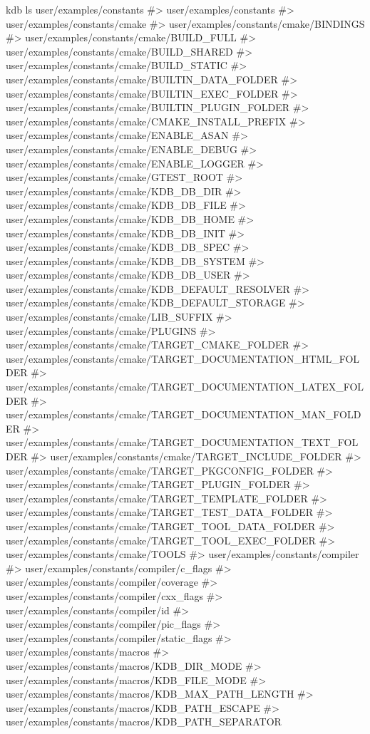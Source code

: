 \begin{DoxyCode}
kdb ls user/examples/constants
#> user/examples/constants
#> user/examples/constants/cmake
#> user/examples/constants/cmake/BINDINGS
#> user/examples/constants/cmake/BUILD\_FULL
#> user/examples/constants/cmake/BUILD\_SHARED
#> user/examples/constants/cmake/BUILD\_STATIC
#> user/examples/constants/cmake/BUILTIN\_DATA\_FOLDER
#> user/examples/constants/cmake/BUILTIN\_EXEC\_FOLDER
#> user/examples/constants/cmake/BUILTIN\_PLUGIN\_FOLDER
#> user/examples/constants/cmake/CMAKE\_INSTALL\_PREFIX
#> user/examples/constants/cmake/ENABLE\_ASAN
#> user/examples/constants/cmake/ENABLE\_DEBUG
#> user/examples/constants/cmake/ENABLE\_LOGGER
#> user/examples/constants/cmake/GTEST\_ROOT
#> user/examples/constants/cmake/KDB\_DB\_DIR
#> user/examples/constants/cmake/KDB\_DB\_FILE
#> user/examples/constants/cmake/KDB\_DB\_HOME
#> user/examples/constants/cmake/KDB\_DB\_INIT
#> user/examples/constants/cmake/KDB\_DB\_SPEC
#> user/examples/constants/cmake/KDB\_DB\_SYSTEM
#> user/examples/constants/cmake/KDB\_DB\_USER
#> user/examples/constants/cmake/KDB\_DEFAULT\_RESOLVER
#> user/examples/constants/cmake/KDB\_DEFAULT\_STORAGE
#> user/examples/constants/cmake/LIB\_SUFFIX
#> user/examples/constants/cmake/PLUGINS
#> user/examples/constants/cmake/TARGET\_CMAKE\_FOLDER
#> user/examples/constants/cmake/TARGET\_DOCUMENTATION\_HTML\_FOLDER
#> user/examples/constants/cmake/TARGET\_DOCUMENTATION\_LATEX\_FOLDER
#> user/examples/constants/cmake/TARGET\_DOCUMENTATION\_MAN\_FOLDER
#> user/examples/constants/cmake/TARGET\_DOCUMENTATION\_TEXT\_FOLDER
#> user/examples/constants/cmake/TARGET\_INCLUDE\_FOLDER
#> user/examples/constants/cmake/TARGET\_PKGCONFIG\_FOLDER
#> user/examples/constants/cmake/TARGET\_PLUGIN\_FOLDER
#> user/examples/constants/cmake/TARGET\_TEMPLATE\_FOLDER
#> user/examples/constants/cmake/TARGET\_TEST\_DATA\_FOLDER
#> user/examples/constants/cmake/TARGET\_TOOL\_DATA\_FOLDER
#> user/examples/constants/cmake/TARGET\_TOOL\_EXEC\_FOLDER
#> user/examples/constants/cmake/TOOLS
#> user/examples/constants/compiler
#> user/examples/constants/compiler/c\_flags
#> user/examples/constants/compiler/coverage
#> user/examples/constants/compiler/cxx\_flags
#> user/examples/constants/compiler/id
#> user/examples/constants/compiler/pic\_flags
#> user/examples/constants/compiler/static\_flags
#> user/examples/constants/macros
#> user/examples/constants/macros/KDB\_DIR\_MODE
#> user/examples/constants/macros/KDB\_FILE\_MODE
#> user/examples/constants/macros/KDB\_MAX\_PATH\_LENGTH
#> user/examples/constants/macros/KDB\_PATH\_ESCAPE
#> user/examples/constants/macros/KDB\_PATH\_SEPARATOR

\end{DoxyCode}
